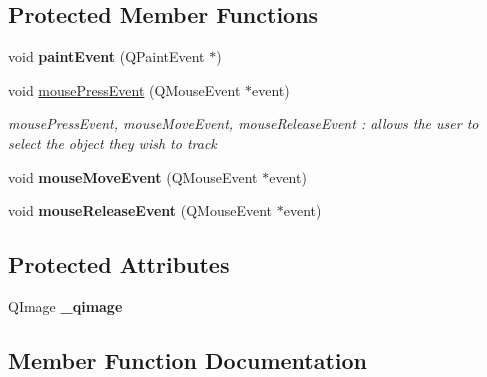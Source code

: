 \subsection*{Protected Member Functions}
\begin{DoxyCompactItemize}
\item 
\hypertarget{classqt_opencv_widget_a9f042370657f65bef7205b12009653ee}{}void {\bfseries paint\+Event} (Q\+Paint\+Event $\ast$)\label{classqt_opencv_widget_a9f042370657f65bef7205b12009653ee}

\item 
void \hyperlink{classqt_opencv_widget_a0aca1ca02cc17b229e0817510e76487e}{mouse\+Press\+Event} (Q\+Mouse\+Event $\ast$event)
\begin{DoxyCompactList}\small\item\em mouse\+Press\+Event, mouse\+Move\+Event, mouse\+Release\+Event \+: allows the user to select the object they wish to track \end{DoxyCompactList}\item 
\hypertarget{classqt_opencv_widget_aefdbc3522bdc2b7102f3a1e7bd597765}{}void {\bfseries mouse\+Move\+Event} (Q\+Mouse\+Event $\ast$event)\label{classqt_opencv_widget_aefdbc3522bdc2b7102f3a1e7bd597765}

\item 
\hypertarget{classqt_opencv_widget_a1c949441cc42b7650f458c0dfced7029}{}void {\bfseries mouse\+Release\+Event} (Q\+Mouse\+Event $\ast$event)\label{classqt_opencv_widget_a1c949441cc42b7650f458c0dfced7029}

\end{DoxyCompactItemize}
\subsection*{Protected Attributes}
\begin{DoxyCompactItemize}
\item 
\hypertarget{classqt_opencv_widget_a18e119a442ebb81a9989196939f72766}{}Q\+Image {\bfseries \+\_\+qimage}\label{classqt_opencv_widget_a18e119a442ebb81a9989196939f72766}

\end{DoxyCompactItemize}


\subsection{Member Function Documentation}
\hypertarget{classqt_opencv_widget_abe980a492d8c367a0401c01e11a9f85c}{}
